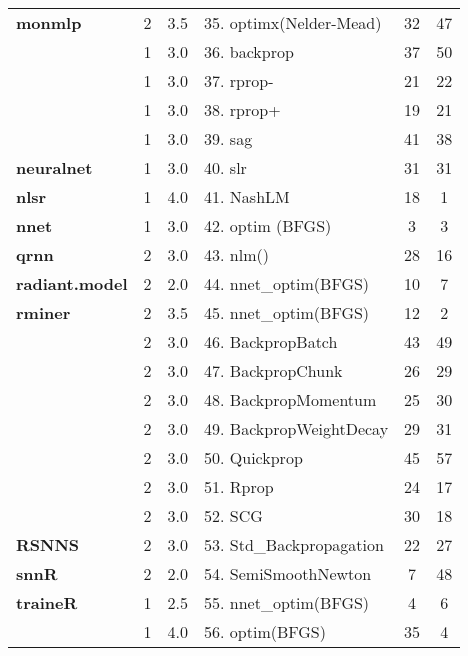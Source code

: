 \begin{Schunk}
\begin{table}
\begin{tabular}[t]{>{}lcclcc}
\multirow{-2}{*}{\raggedright\arraybackslash \textbf{monmlp}} & 2 & 3.5 & 35. optimx(Nelder-Mead) & 32 & 47\\
\cmidrule{1-6}
 & 1 & 3.0 & 36. backprop & 37 & 50\\

 & 1 & 3.0 & 37. rprop- & 21 & 22\\

 & 1 & 3.0 & 38. rprop+ & 19 & 21\\

 & 1 & 3.0 & 39. sag & 41 & 38\\

\multirow{-5}{*}{\raggedright\arraybackslash \textbf{neuralnet}} & 1 & 3.0 & 40. slr & 31 & 31\\
\cmidrule{1-6}
\textbf{nlsr} & 1 & 4.0 & 41. NashLM & 18 & 1\\
\cmidrule{1-6}
\textbf{nnet} & 1 & 3.0 & 42. optim (BFGS) & 3 & 3\\
\cmidrule{1-6}
\textbf{qrnn} & 2 & 3.0 & 43. nlm() & 28 & 16\\
\cmidrule{1-6}
\textbf{radiant.model} & 2 & 2.0 & 44. nnet\_optim(BFGS) & 10 & 7\\
\cmidrule{1-6}
\textbf{rminer} & 2 & 3.5 & 45. nnet\_optim(BFGS) & 12 & 2\\
\cmidrule{1-6}
 & 2 & 3.0 & 46. BackpropBatch & 43 & 49\\

 & 2 & 3.0 & 47. BackpropChunk & 26 & 29\\

 & 2 & 3.0 & 48. BackpropMomentum & 25 & 30\\

 & 2 & 3.0 & 49. BackpropWeightDecay & 29 & 31\\

 & 2 & 3.0 & 50. Quickprop & 45 & 57\\

 & 2 & 3.0 & 51. Rprop & 24 & 17\\

 & 2 & 3.0 & 52. SCG & 30 & 18\\

\multirow{-8}{*}{\raggedright\arraybackslash \textbf{RSNNS}} & 2 & 3.0 & 53. Std\_Backpropagation & 22 & 27\\
\cmidrule{1-6}
\textbf{snnR} & 2 & 2.0 & 54. SemiSmoothNewton & 7 & 48\\
\cmidrule{1-6}
\textbf{traineR} & 1 & 2.5 & 55. nnet\_optim(BFGS) & 4 & 6\\
\cmidrule{1-6}
 & 1 & 4.0 & 56. optim(BFGS) & 35 & 4\\


\end{tabular}
\end{table}
\end{Schunk}
